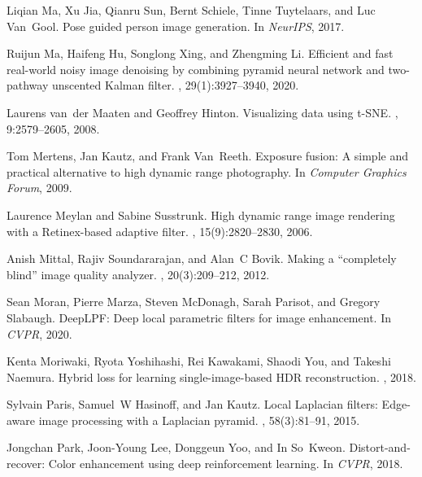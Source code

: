 \documentclass[final]{cvpr}
\begin{document}
{\begin{thebibliography}{10}
Liqian Ma, Xu Jia, Qianru Sun, Bernt Schiele, Tinne Tuytelaars, and Luc
  Van~Gool.
\newblock Pose guided person image generation.
\newblock In {\em NeurIPS}, 2017.

Ruijun Ma, Haifeng Hu, Songlong Xing, and Zhengming Li.
\newblock Efficient and fast real-world noisy image denoising by combining
  pyramid neural network and two-pathway unscented {K}alman filter.
, 29(1):3927--3940, 2020.

Laurens van~der Maaten and Geoffrey Hinton.
\newblock Visualizing data using t-{S}{N}{E}.
, 9:2579--2605, 2008.

Tom Mertens, Jan Kautz, and Frank Van~Reeth.
\newblock Exposure fusion: {A} simple and practical alternative to high dynamic
  range photography.
\newblock In {\em Computer Graphics Forum}, 2009.

Laurence Meylan and Sabine Susstrunk.
\newblock High dynamic range image rendering with a {R}etinex-based adaptive
  filter.
, 15(9):2820--2830, 2006.

Anish Mittal, Rajiv Soundararajan, and Alan~C Bovik.
\newblock Making a ``completely blind'' image quality analyzer.
, 20(3):209--212, 2012.

Sean Moran, Pierre Marza, Steven McDonagh, Sarah Parisot, and Gregory Slabaugh.
\newblock Deep{L}{P}{F}: Deep local parametric filters for image enhancement.
\newblock In {\em CVPR}, 2020.

Kenta Moriwaki, Ryota Yoshihashi, Rei Kawakami, Shaodi You, and Takeshi
  Naemura.
\newblock Hybrid loss for learning single-image-based {H}{D}{R} reconstruction.
, 2018.

Sylvain Paris, Samuel~W Hasinoff, and Jan Kautz.
\newblock Local {L}aplacian filters: {E}dge-aware image processing with a
  {L}aplacian pyramid.
, 58(3):81--91, 2015.

Jongchan Park, Joon-Young Lee, Donggeun Yoo, and In So~Kweon.
\newblock Distort-and-recover: {C}olor enhancement using deep reinforcement
  learning.
\newblock In {\em CVPR}, 2018.


\end{thebibliography}}
\end{document}
